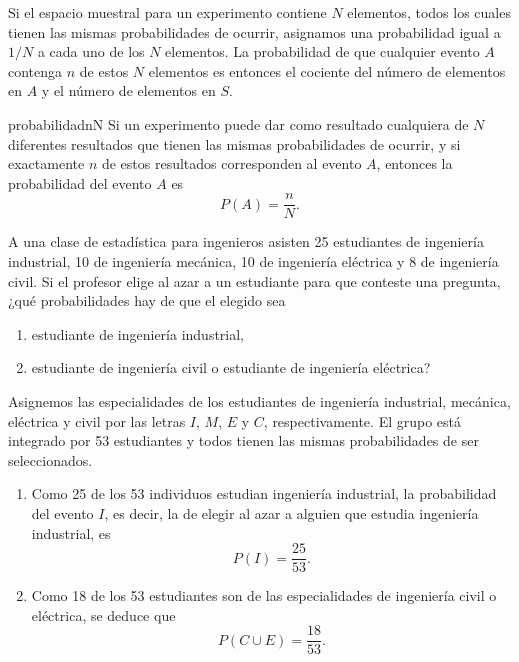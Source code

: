 Si el espacio muestral para un experimento contiene $N$ elementos, todos los cuales tienen las mismas probabilidades de ocurrir, asignamos una probabilidad igual a $1/N$ a cada uno de los $N$ elementos. La probabilidad de que cualquier evento $A$ contenga $n$ de estos $N$ elementos es entonces el cociente del número de elementos en $A$ y el número de elementos en $S$.

\begin{definicion}{}{probabilidadnN}
    Si un experimento puede dar como resultado cualquiera de $N$ diferentes resultados que tienen las mismas probabilidades de ocurrir, y si exactamente $n$ de estos resultados corresponden al evento $A$, entonces la probabilidad del evento $A$ es
    $$P(A) = \frac{n}{N}.$$
\end{definicion}

\begin{examplebox}{}{}
    A una clase de estadística para ingenieros asisten 25 estudiantes de ingeniería industrial, 10 de ingeniería mecánica, 10 de ingeniería eléctrica y 8 de ingeniería civil. Si el profesor elige al azar a un estudiante para que conteste una pregunta, ¿qué probabilidades hay de que el elegido sea
    \begin{enumerate}[label=\alph*), topsep=6pt, itemsep=0pt]
        \item estudiante de ingeniería industrial,
        \item estudiante de ingeniería civil o estudiante de ingeniería eléctrica?
    \end{enumerate}
    \tcblower
    \solucion Asignemos las especialidades de los estudiantes de ingeniería industrial, mecánica, eléctrica y civil por las letras $I$, $M$, $E$ y $C$, respectivamente. El grupo está integrado por 53 estudiantes y todos tienen las mismas probabilidades de ser seleccionados.
    \begin{enumerate}[label=\alph*), topsep=6pt, itemsep=0pt]
        \item Como 25 de los 53 individuos estudian ingeniería industrial, la probabilidad del evento $I$, es decir, la de elegir al azar a alguien que estudia ingeniería industrial, es
        $$P(I) = \frac{25}{53}.$$
        \item Como 18 de los 53 estudiantes son de las especialidades de ingeniería civil o eléctrica, se deduce que
        $$P(C \cup E) = \frac{18}{53}.$$
    \end{enumerate}
\end{examplebox}